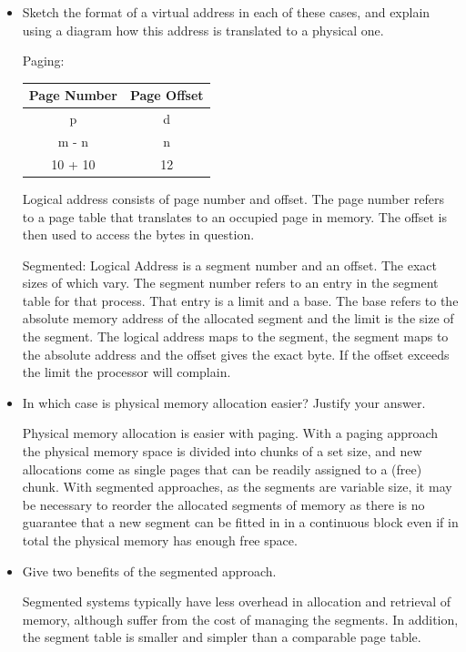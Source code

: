 \documentclass[]{article}
\begin{document}
        \begin{itemize}
            \item Sketch the format of a virtual address in each of these cases, and explain using a diagram how this address is translated to a physical one.

            Paging:
            \begin{table}[ht]
                \centering
                \begin{tabular}{cc}\hline\hline
                Page Number & Page Offset \\\hline
                p & d \\
                m - n & n \\
                10 + 10 & 12 \\\hline\hline
                \end{tabular}
            \end{table}

            Logical address consists of page number and offset. The page number refers to a page table that translates to an occupied page in memory. The offset is then used to access the bytes in question.

            Segmented:
            Logical Address is a segment number and an offset. The exact sizes of which vary. The segment number refers to an entry in the segment table for that process. That entry is a limit and a base. The base refers to the absolute memory address of the allocated segment and the limit is the size of the segment. The logical address maps to the segment, the segment maps to the absolute address and the offset gives the exact byte. If the offset exceeds the limit the processor will complain.

            \item In which case is physical memory allocation easier? Justify your answer.

            Physical memory allocation is easier with paging. With a paging approach the physical memory space is divided into chunks of a set size, and new allocations come as single pages that can be readily assigned to a (free) chunk. With segmented approaches, as the segments are variable size, it may be necessary to reorder the allocated segments of memory as there is no guarantee that a new segment can be fitted in in a continuous block even if in total the physical memory has enough free space.

            \item Give two benefits of the segmented approach.

            Segmented systems typically have less overhead in allocation and retrieval of memory, although suffer from the cost of managing the segments. In addition, the segment table is smaller and simpler than a comparable page table.
        \end{itemize}
\end{document}
